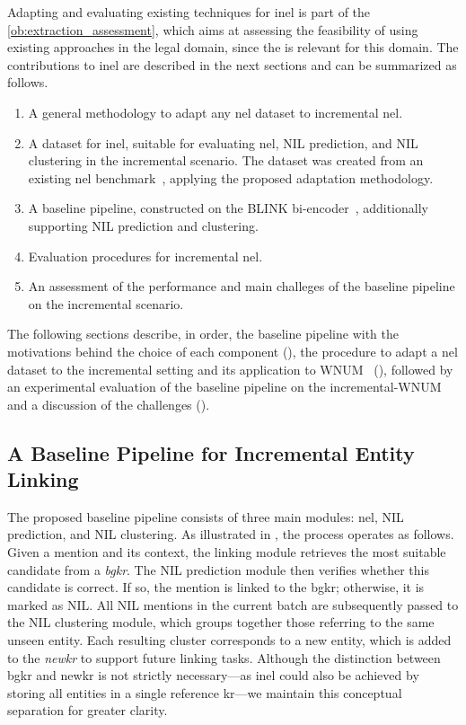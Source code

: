 Adapting and evaluating existing techniques for \acl{inel} is part of the \ref{ob:extraction_assessment}, which aims at assessing the feasibility of using existing approaches in the legal domain, since the \nilchallenge is relevant for this domain.
The contributions to \acl{inel} are described in the next sections and can be summarized as follows.
\begin{enumerate}
    \item A general methodology to adapt any \ac{nel} dataset to incremental \ac{nel}.
    \item A dataset for \ac{inel}, suitable for evaluating \ac{nel}, NIL prediction, and NIL clustering in the incremental scenario. The dataset was created from an existing \ac{nel} benchmark~\cite{Onoe_Durrett_2020}, applying the proposed adaptation methodology.
    \item A baseline pipeline, constructed on the BLINK bi-encoder~\cite{blink}, additionally supporting NIL prediction and clustering.
    \item Evaluation procedures for incremental \ac{nel}.
    \item An assessment of the performance and main challeges of the baseline pipeline on the incremental scenario.
\end{enumerate}


The following sections describe, in order, the baseline pipeline with the motivations behind the choice of each component (), the procedure to adapt a \ac{nel} dataset to the incremental setting and its application to WNUM~\cite{Onoe_Durrett_2020} (), followed by an experimental evaluation of the baseline pipeline on the incremental-WNUM and a discussion of the challenges ().

\subsection{A Baseline Pipeline for Incremental Entity Linking}
\label{sec:ijckg:pipeline}

The proposed baseline pipeline consists of three main modules: \ac{nel}, NIL prediction, and NIL clustering. As illustrated in , the process operates as follows. Given a mention and its context, the linking module retrieves the most suitable candidate from a \emph{\acf{bgkr}}. The NIL prediction module then verifies whether this candidate is correct. If so, the mention is linked to the \ac{bgkr}; otherwise, it is marked as NIL. All NIL mentions in the current batch are subsequently passed to the NIL clustering module, which groups together those referring to the same unseen entity. Each resulting cluster corresponds to a new entity, which is added to the \emph{\acf{newkr}} to support future linking tasks. Although the distinction between \ac{bgkr} and \ac{newkr} is not strictly necessary---as \ac{inel} could also be achieved by storing all entities in a single reference \ac{kr}---we maintain this conceptual separation for greater clarity.


